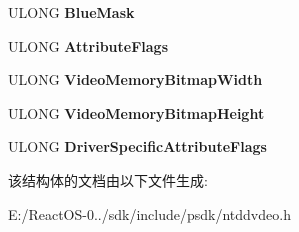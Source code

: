 \begin{DoxyCompactItemize}
U\+L\+O\+NG {\bfseries Blue\+Mask}
\item 
\mbox{\label{struct___v_i_d_e_o___m_o_d_e___i_n_f_o_r_m_a_t_i_o_n_a02a16b10aad2b86787abb18b2fb2a44d}} 
U\+L\+O\+NG {\bfseries Attribute\+Flags}
\item 
\mbox{\label{struct___v_i_d_e_o___m_o_d_e___i_n_f_o_r_m_a_t_i_o_n_adb506281ffc9054a932a181e726e9da6}} 
U\+L\+O\+NG {\bfseries Video\+Memory\+Bitmap\+Width}
\item 
\mbox{\label{struct___v_i_d_e_o___m_o_d_e___i_n_f_o_r_m_a_t_i_o_n_aeda32f31008dbc3458303d7abca3cdce}} 
U\+L\+O\+NG {\bfseries Video\+Memory\+Bitmap\+Height}
\item 
\mbox{\label{struct___v_i_d_e_o___m_o_d_e___i_n_f_o_r_m_a_t_i_o_n_a646f30f960e8946a40f2ae9efd223d14}} 
U\+L\+O\+NG {\bfseries Driver\+Specific\+Attribute\+Flags}
\end{DoxyCompactItemize}


该结构体的文档由以下文件生成\+:\begin{DoxyCompactItemize}
\item 
E\+:/\+React\+O\+S-\/0../sdk/include/psdk/ntddvdeo.\+h\end{DoxyCompactItemize}
